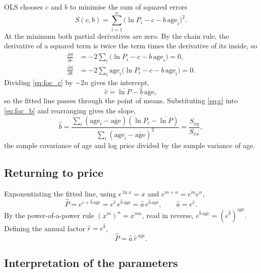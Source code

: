 \documentclass[11pt,a4paper]{article}
\newcommand{\age}{\mathrm{age}}
\begin{document}
OLS chooses $c$ and $b$ to minimise the sum of squared errors
\begin{equation}
\label{eq:sse}
S(c,b) = \sum_{i=1}^{n} \bigl(\ln P_i - c - b\,\age_i\bigr)^2 .
\end{equation}
At the minimum both partial derivatives are zero. By the chain rule, the derivative of a squared term is twice the term times the derivative of its inside, so
\begin{align}
\frac{\partial S}{\partial c} &= -2\sum_{i} \bigl(\ln P_i - c - b\,\age_i\bigr) = 0, \label{eq:foc_c}\\
\frac{\partial S}{\partial b} &= -2\sum_{i} \age_i\bigl(\ln P_i - c - b\,\age_i\bigr) = 0. \label{eq:foc_b}
\end{align}
Dividing \eqref{eq:foc_c} by $-2n$ gives the intercept,
\begin{equation}
\label{eq:c}
\hat c = \overline{\ln P} - \hat b\,\overline{\age},
\end{equation}
so the fitted line passes through the point of means. Substituting \eqref{eq:c} into \eqref{eq:foc_b} and rearranging gives the slope,
\begin{equation}
\label{eq:b}
\hat b = \frac{\sum_i (\age_i - \overline{\age})(\ln P_i - \overline{\ln P})}{\sum_i (\age_i - \overline{\age})^2}
= \frac{S_{xy}}{S_{xx}},
\end{equation}
the sample covariance of age and log price divided by the sample variance of age.

\subsection{Returning to price}

Exponentiating the fitted line, using $e^{\ln x} = x$ and $e^{m+n} = e^m e^n$,
\[
\hat P = e^{\hat c + \hat b\,\age} = e^{\hat c}\, e^{\hat b\,\age} = \hat a\, e^{\hat b\,\age}, \qquad \hat a = e^{\hat c}.
\]
By the power-of-a-power rule $(x^m)^n = x^{mn}$, read in reverse, $e^{\hat b\,\age} = (e^{\hat b})^{\age}$. Defining the annual factor $\hat r = e^{\hat b}$,
\begin{equation}
\label{eq:rform}
\boxed{\;\hat P = \hat a\,\hat r^{\,\age}.\;}
\end{equation}

\subsection{Interpretation of the parameters}
\end{document}

